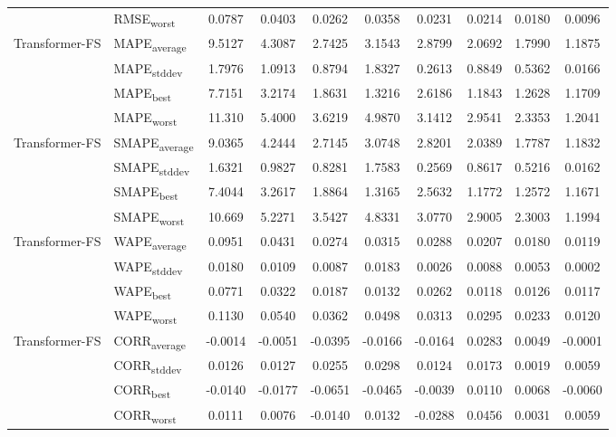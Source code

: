 {\begin{longtable}{l l c c c c c c c c}
 & RMSE\textsubscript{worst} & 0.0787 & 0.0403 & 0.0262 & 0.0358 & 0.0231 & 0.0214 & 0.0180 & 0.0096 \\
\cmidrule(lr){2-10}
\multirow{4}{*}{Transformer-FS} & MAPE\textsubscript{average} & 9.5127 & 4.3087 & 2.7425 & 3.1543 & 2.8799 & 2.0692 & 1.7990 & 1.1875 \\
 & MAPE\textsubscript{stddev} & 1.7976 & 1.0913 & 0.8794 & 1.8327 & 0.2613 & 0.8849 & 0.5362 & 0.0166 \\
 & MAPE\textsubscript{best} & 7.7151 & 3.2174 & 1.8631 & 1.3216 & 2.6186 & 1.1843 & 1.2628 & 1.1709 \\
 & MAPE\textsubscript{worst} & 11.310 & 5.4000 & 3.6219 & 4.9870 & 3.1412 & 2.9541 & 2.3353 & 1.2041 \\
\cmidrule(lr){2-10}
\multirow{4}{*}{Transformer-FS} & SMAPE\textsubscript{average} & 9.0365 & 4.2444 & 2.7145 & 3.0748 & 2.8201 & 2.0389 & 1.7787 & 1.1832 \\
 & SMAPE\textsubscript{stddev} & 1.6321 & 0.9827 & 0.8281 & 1.7583 & 0.2569 & 0.8617 & 0.5216 & 0.0162 \\
 & SMAPE\textsubscript{best} & 7.4044 & 3.2617 & 1.8864 & 1.3165 & 2.5632 & 1.1772 & 1.2572 & 1.1671 \\
 & SMAPE\textsubscript{worst} & 10.669 & 5.2271 & 3.5427 & 4.8331 & 3.0770 & 2.9005 & 2.3003 & 1.1994 \\
\cmidrule(lr){2-10}
\multirow{4}{*}{Transformer-FS} & WAPE\textsubscript{average} & 0.0951 & 0.0431 & 0.0274 & 0.0315 & 0.0288 & 0.0207 & 0.0180 & 0.0119 \\
 & WAPE\textsubscript{stddev} & 0.0180 & 0.0109 & 0.0087 & 0.0183 & 0.0026 & 0.0088 & 0.0053 & 0.0002 \\
 & WAPE\textsubscript{best} & 0.0771 & 0.0322 & 0.0187 & 0.0132 & 0.0262 & 0.0118 & 0.0126 & 0.0117 \\
 & WAPE\textsubscript{worst} & 0.1130 & 0.0540 & 0.0362 & 0.0498 & 0.0313 & 0.0295 & 0.0233 & 0.0120 \\
\cmidrule(lr){2-10}
\multirow{4}{*}{Transformer-FS} & CORR\textsubscript{average} & -0.0014 & -0.0051 & -0.0395 & -0.0166 & -0.0164 & 0.0283 & 0.0049 & -0.0001 \\
 & CORR\textsubscript{stddev} & 0.0126 & 0.0127 & 0.0255 & 0.0298 & 0.0124 & 0.0173 & 0.0019 & 0.0059 \\
 & CORR\textsubscript{best} & -0.0140 & -0.0177 & -0.0651 & -0.0465 & -0.0039 & 0.0110 & 0.0068 & -0.0060 \\
 & CORR\textsubscript{worst} & 0.0111 & 0.0076 & -0.0140 & 0.0132 & -0.0288 & 0.0456 & 0.0031 & 0.0059 \\

\end{longtable}}

